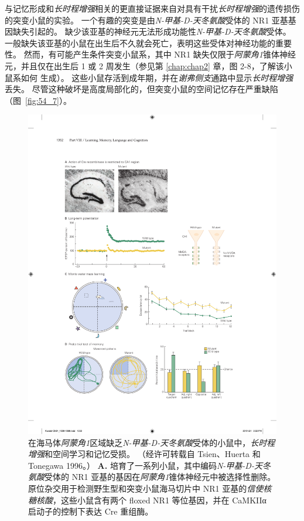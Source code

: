 与记忆形成和\textit{长时程增强}相关的更直接证据来自对具有干扰\textit{长时程增强}的遗传损伤的突变小鼠的实验。
一个有趣的突变是由\textit{N-甲基-D-天冬氨酸}受体的 NR1 亚基基因缺失引起的。
缺少该亚基的神经元无法形成功能性\textit{N-甲基-D-天冬氨酸}受体。
一般缺失该亚基的小鼠在出生后不久就会死亡，表明这些受体对神经功能的重要性。
然而，有可能产生条件突变小鼠系，其中 NR1 缺失仅限于\textit{阿蒙角1}锥体神经元，并且仅在出生后 1 或 2 周发生（参见第 \ref{chap:chap2} 章，图 2-8，了解该小鼠系如何 生成）。
这些小鼠存活到成年期，并在\textit{谢弗侧支}通路中显示\textit{长时程增强}丢失。
尽管这种破坏是高度局部化的，但突变小鼠的空间记忆存在严重缺陷（图~\ref{fig:54_7}）。


\begin{figure}[htbp]
	\centering
	\includegraphics[width=0.9\linewidth]{chap54/fig_54_7}
	\caption{在海马体\textit{阿蒙角1}区域缺乏\textit{N-甲基-D-天冬氨酸}受体的小鼠中，\textit{长时程增强}和空间学习和记忆受损。
		（经许可转载自 Tsien、Huerta 和 Tonegawa 1996。）
		\textbf{A.} 培育了一系列小鼠，其中编码\textit{N-甲基-D-天冬氨酸}受体的 NR1 亚基的基因在\textit{阿蒙角1}锥体神经元中被选择性删除。
		原位杂交用于检测野生型和突变小鼠海马切片中 NR1 亚基的\textit{信使核糖核酸}，这些小鼠含有两个 floxed NR1 等位基因，并在 CaMKIIα 启动子的控制下表达 Cre 重组酶。
}
\end{figure}
